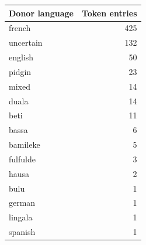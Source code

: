 \begin{tabular}{@{}lr@{}}
\toprule
\textbf{Donor language} & \textbf{Token entries} \\
\midrule
french & 425 \\
uncertain & 132 \\
english & 50 \\
pidgin & 23 \\
mixed & 14 \\
duala & 14 \\
beti & 11 \\
bassa & 6 \\
bamileke & 5 \\
fulfulde & 3 \\
hausa & 2 \\
bulu & 1 \\
german & 1 \\
lingala & 1 \\
spanish & 1 \\
\bottomrule
\end{tabular}
